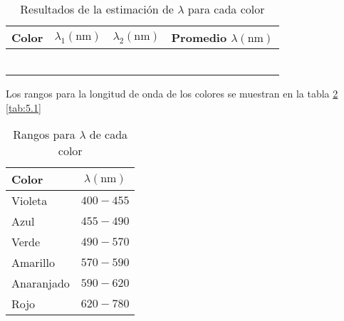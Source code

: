 \documentclass[12pt,a4paper]{article}
\begin{document}
	 \begin{table}[!htb]
	 	\centering
	 	\caption{Resultados de la estimación de $ \lambda $ para cada color}
	 	\begin{tabular}{|l|c|c|c|}
	 		\hline
	 		Color & $ \lambda_1(\mbox{nm})$ & $ \lambda_2(\mbox{nm})$ & Promedio $ \lambda (\mbox{nm}) $ \\
	 		\hline
	 		\cellcolor{violet!40     }{Violeta   } & \cellcolor{violet!25     }{$ 346.4805\pm3.7237 $} & \cellcolor{violet!25     }{$ {408.3907\pm1.9001} $} & \cellcolor{violet!25     }{$ 377.4356\pm2.8119 $} \\ \hline
	 		\cellcolor{blue!40       }{Azul      } & \cellcolor{blue!25       }{$ 406.9889\pm3.7766 $} & \cellcolor{blue!25       }{$ {443.9966\pm1.8722} $} & \cellcolor{blue!25       }{$ 425.4927\pm2.8244 $} \\ \hline
	 		\cellcolor{ForestGreen!40}{Verde     } & \cellcolor{ForestGreen!25}{$ 436.8139\pm3.7982 $} & \cellcolor{ForestGreen!25}{$ {499.2184\pm1.8124} $} & \cellcolor{ForestGreen!25}{$ 468.0162\pm2.8053 $} \\ \hline
	 		\cellcolor{yellow!40     }{Amarillo  } & \cellcolor{yellow!25     }{$ 495.5247\pm3.8316 $} & \cellcolor{yellow!25     }{$ {539.7928\pm1.7560} $} & \cellcolor{yellow!25     }{$ 517.6587\pm2.7938 $} \\ \hline
	 		\cellcolor{orange!40     }{Anaranjado} & \cellcolor{orange!25     }{$ 524.3816\pm3.8436 $} & \cellcolor{orange!25     }{$ {549.4541\pm1.7412} $} & \cellcolor{orange!25     }{$ 536.9179\pm2.7924 $} \\ \hline
	 		\cellcolor{red!40        }{Rojo      } & \cellcolor{red!25        }{$ 608.8102\pm3.8620 $} & \cellcolor{red!25        }{$ {595.0045\pm1.6637} $} & \cellcolor{red!25        }{$ 601.9073\pm2.7629 $} \\ \hline
	 	\end{tabular}
	 	\label{tab:4.1}
	 \end{table}
	 
	 \newpage
	 Los rangos para la longitud de onda de los colores se muestran en la tabla \ref{tab:5} \ref{tab:5.1}
	 
	 \begin{table}[!htb]
	 	\centering
	 	\caption{Rangos para $ \lambda $ de cada color}
	 	\begin{tabular}{|l|c|}
	 		\hline
	 		Color & $ \lambda(\mbox{nm})$ \\
	 		\hline
	 		Violeta    & $ 400 - 455 $  \\ \hline
	 		Azul       & $ 455 - 490 $  \\ \hline
	 		Verde      & $ 490 - 570 $  \\ \hline
	 		Amarillo   & $ 570 - 590 $  \\ \hline
	 		Anaranjado & $ 590 - 620 $  \\ \hline
	 		Rojo       & $ 620 - 780 $  \\ \hline
	 	\end{tabular}
	 	\label{tab:5}
	 \end{table}
	 
\end{document}
